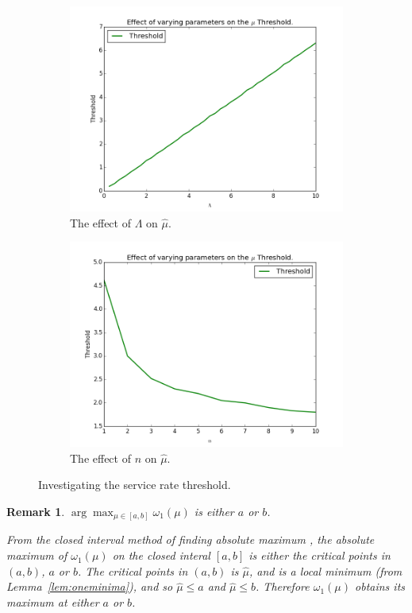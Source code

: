 \documentclass{article}
\newtheorem{remark}{Remark}
\begin{document}
\begin{figure}[!htbp]
\begin{subfigure}[b]{0.5\textwidth}
    \includegraphics[width=\textwidth]{images/plot_thresholds_L}
    \caption{The effect of $\Lambda$ on $\hat{\mu}$.}
    \label{fig:threshold_L}
  \end{subfigure}
  \begin{subfigure}[b]{0.5\textwidth}
    \includegraphics[width=\textwidth]{images/plot_thresholds_n}
    \caption{The effect of $n$ on $\hat{\mu}$.}
    \label{fig:threshold_n}
  \end{subfigure}
  \caption{Investigating the service rate threshold.}
  \label{fig:threshold_investigate}
\end{figure}

\begin{remark}
$\arg\max_{\mu \in [a, b]} \omega_1(\mu)$ is either $a$ or $b$.

From the closed interval method of finding absolute maximum \cite{tan09}, the absolute maximum of $\omega_1(\mu)$ on the closed interal $[a, b]$ is either the critical points in $(a, b)$, $a$ or $b$.
The critical points in $(a, b)$ is $\hat{\mu}$, and is a local minimum (from Lemma~\ref{lem:oneminima}), and so $\hat{\mu} \leq a$ and $\hat{\mu} \leq b$.
Therefore $\omega_1(\mu)$ obtains its maximum at either $a$ or $b$.
\end{remark}
\end{document}
